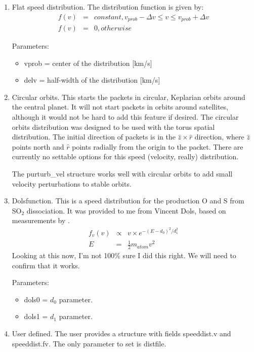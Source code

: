 \documentclass[11pt]{article}
\begin{document}
\begin{enumerate}
\item Flat speed distribution. The distribution function is given by:
\begin{eqnarray}
f(v) & = & constant, v_{prob}-\Delta v \leq v \leq v_{prob}+\Delta v \\
f(v) & = & 0, otherwise
\end{eqnarray}

Parameters:
  \begin{itemize}
  \item vprob = center of the distribution [km/s]
  \item delv = half-width of the distribution [km/s]
  \end{itemize}

\item Circular orbits. This starts the packets in circular, Keplarian orbits
around the central planet. It will not start packets in orbits around
satellites, although it would not be hard to add this feature if desired. The
circular orbits distribution was designed to be used with
the torus spatial distribution. The initial direction of packets is in the
$\hat{z} \times \hat{r}$ direction, where $\hat{z}$ points north and $\hat{r}$
points radially from the origin to the packet. There are currently no settable
options for this speed (velocity, really) distribution.

The purturb\_vel structure works well with circular orbits to add small
velocity perturbations to stable orbits.

\item Dolsfunction. This is a speed distribution for the production O and S
from SO$_2$ dissociation. It was provided to me from Vincent Dols, based on
measurements by \cite{vattipalle2004}. 
\begin{eqnarray}
f_v(v) & \propto & v \times e^{-(E-d_0)^2/d_1^2} \\
E & = & \frac{1}{2} m_{atom} v^2 
\end{eqnarray}
Looking at this now, I'm not 100\% sure I did this right. We will need to
confirm that it works.

Parameters:
  \begin{itemize}
  \item dols0 = $d_0$ parameter.
  \item dols1 = $d_1$ parameter.
  \end{itemize}

\item User defined. The user provides a structure with fields speeddist.v and 
speeddist.fv. The only parameter to set is distfile.
\end{enumerate}
\end{document}
